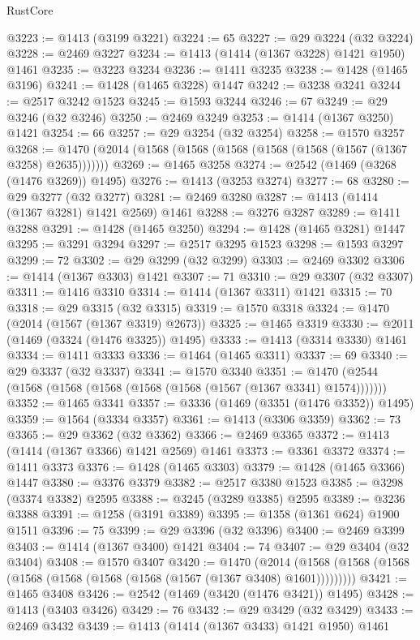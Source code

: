 \begin{lexlean}{RustCore}
\begin{coremodule}
@3223 := @1413 (@3199 @3221)
@3224 := 65
@3227 := @29 @3224 (@32 @3224)
@3228 := @2469 @3227
@3234 := @1413 (@1414 (@1367 @3228) @1421 @1950) @1461
@3235 := @3223 @3234
@3236 := @1411 @3235
@3238 := @1428 (@1465 @3196)
@3241 := @1428 (@1465 @3228) @1447
@3242 := @3238 @3241
@3244 := @2517 @3242 @1523
@3245 := @1593 @3244
@3246 := 67
@3249 := @29 @3246 (@32 @3246)
@3250 := @2469 @3249
@3253 := @1414 (@1367 @3250) @1421
@3254 := 66
@3257 := @29 @3254 (@32 @3254)
@3258 := @1570 @3257
@3268 := @1470 (@2014 (@1568 (@1568 (@1568 (@1568 (@1568 (@1567 (@1367 @3258) @2635)))))))
@3269 := @1465 @3258
@3274 := @2542 (@1469 (@3268 (@1476 @3269)) @1495)
@3276 := @1413 (@3253 @3274)
@3277 := 68
@3280 := @29 @3277 (@32 @3277)
@3281 := @2469 @3280
@3287 := @1413 (@1414 (@1367 @3281) @1421 @2569) @1461
@3288 := @3276 @3287
@3289 := @1411 @3288
@3291 := @1428 (@1465 @3250)
@3294 := @1428 (@1465 @3281) @1447
@3295 := @3291 @3294
@3297 := @2517 @3295 @1523
@3298 := @1593 @3297
@3299 := 72
@3302 := @29 @3299 (@32 @3299)
@3303 := @2469 @3302
@3306 := @1414 (@1367 @3303) @1421
@3307 := 71
@3310 := @29 @3307 (@32 @3307)
@3311 := @1416 @3310
@3314 := @1414 (@1367 @3311) @1421
@3315 := 70
@3318 := @29 @3315 (@32 @3315)
@3319 := @1570 @3318
@3324 := @1470 (@2014 (@1567 (@1367 @3319) @2673))
@3325 := @1465 @3319
@3330 := @2011 (@1469 (@3324 (@1476 @3325)) @1495)
@3333 := @1413 (@3314 @3330) @1461
@3334 := @1411 @3333
@3336 := @1464 (@1465 @3311)
@3337 := 69
@3340 := @29 @3337 (@32 @3337)
@3341 := @1570 @3340
@3351 := @1470 (@2544 (@1568 (@1568 (@1568 (@1568 (@1568 (@1567 (@1367 @3341) @1574)))))))
@3352 := @1465 @3341
@3357 := @3336 (@1469 (@3351 (@1476 @3352)) @1495)
@3359 := @1564 (@3334 @3357)
@3361 := @1413 (@3306 @3359)
@3362 := 73
@3365 := @29 @3362 (@32 @3362)
@3366 := @2469 @3365
@3372 := @1413 (@1414 (@1367 @3366) @1421 @2569) @1461
@3373 := @3361 @3372
@3374 := @1411 @3373
@3376 := @1428 (@1465 @3303)
@3379 := @1428 (@1465 @3366) @1447
@3380 := @3376 @3379
@3382 := @2517 @3380 @1523
@3385 := @3298 (@3374 @3382) @2595
@3388 := @3245 (@3289 @3385) @2595
@3389 := @3236 @3388
@3391 := @1258 (@3191 @3389)
@3395 := @1358 (@1361 @624) @1900 @1511
@3396 := 75
@3399 := @29 @3396 (@32 @3396)
@3400 := @2469 @3399
@3403 := @1414 (@1367 @3400) @1421
@3404 := 74
@3407 := @29 @3404 (@32 @3404)
@3408 := @1570 @3407
@3420 := @1470
    (@2014 (@1568 (@1568 (@1568 (@1568 (@1568 (@1568 (@1568 (@1567 (@1367 @3408) @1601)))))))))
@3421 := @1465 @3408
@3426 := @2542 (@1469 (@3420 (@1476 @3421)) @1495)
@3428 := @1413 (@3403 @3426)
@3429 := 76
@3432 := @29 @3429 (@32 @3429)
@3433 := @2469 @3432
@3439 := @1413 (@1414 (@1367 @3433) @1421 @1950) @1461

\end{coremodule}
\end{lexlean}
